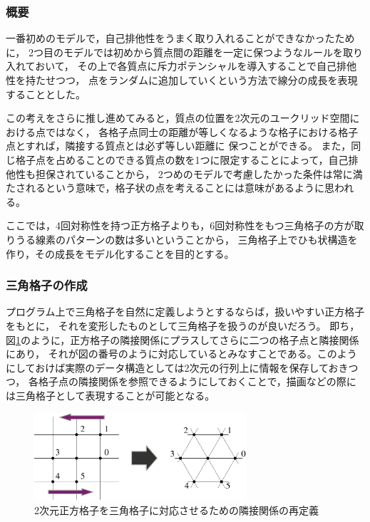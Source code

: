 \subsubsection{概要}

一番初めのモデルで，自己排他性をうまく取り入れることができなかったために，
2つ目のモデルでは初めから質点間の距離を一定に保つようなルールを取り入れておいて，
その上で各質点に斥力ポテンシャルを導入することで自己排他性を持たせつつ，
点をランダムに追加していくという方法で線分の成長を表現することとした。

この考えをさらに推し進めてみると，質点の位置を2次元のユークリッド空間における点ではなく，
各格子点同士の距離が等しくなるような格子における格子点とすれば，隣接する質点とは必ず等しい距離に
保つことができる。
また，同じ格子点を占めることのできる質点の数を1つに限定することによって，自己排他性も担保されていることから，
2つめのモデルで考慮したかった条件は常に満たされるという意味で，格子状の点を考えることには意味があるように思われる。

ここでは，4回対称性を持つ正方格子よりも，6回対称性をもつ三角格子の方が取りうる線素のパターンの数は多いということから，
三角格子上でひも状構造を作り，その成長をモデル化することを目的とする。

\subsubsection{三角格子の作成}

プログラム上で三角格子を自然に定義しようとするならば，扱いやすい正方格子をもとに，
それを変形したものとして三角格子を扱うのが良いだろう。
即ち，図\ref{fig:trilattice}のように，正方格子の隣接関係にプラスしてさらに二つの格子点と隣接関係にあり，
それが図の番号のように対応しているとみなすことである。このようにしておけば実際のデータ構造としては2次元の行列上に情報を保存しておきつつ，
各格子点の隣接関係を参照できるようにしておくことで，描画などの際には三角格子として表現することが可能となる。

\begin{figure}[H]
  \begin{center}
    \includegraphics[width=0.7\textwidth]{../img/triangular_lattice.pdf}
    \caption{2次元正方格子を三角格子に対応させるための隣接関係の再定義}
    \label{fig:trilattice}
  \end{center}
\end{figure}

